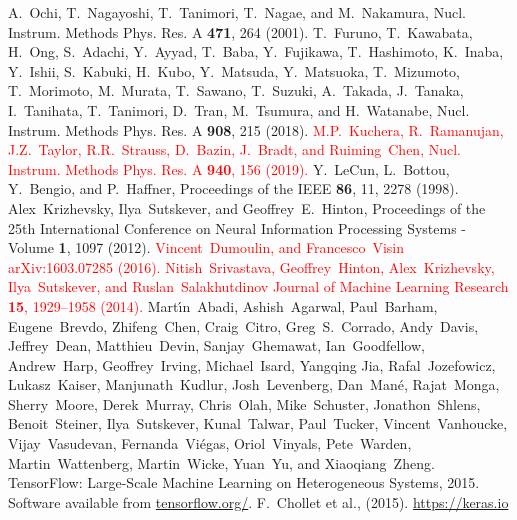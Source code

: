 \documentclass{jps-cp}
\begin{document}
\begin{thebibliography}{9}
  A.~Ochi, T.~Nagayoshi, T.~Tanimori, T.~Nagae, and M.~Nakamura,
  Nucl. Instrum. Methods Phys. Res. A \textbf{471}, 264 (2001).
  T.~Furuno, T.~Kawabata, H.~Ong, S.~Adachi, Y.~Ayyad, T.~Baba, Y.~Fujikawa, T.~Hashimoto, K.~Inaba, Y.~Ishii,
  S.~Kabuki, H.~Kubo, Y.~Matsuda, Y.~Matsuoka, T.~Mizumoto, T.~Morimoto, M.~Murata, T.~Sawano, T.~Suzuki, A.~Takada,
  J.~Tanaka, I.~Tanihata, T.~Tanimori, D.~Tran, M.~Tsumura, and H.~Watanabe,
  Nucl. Instrum. Methods Phys. Res. A \textbf{908}, 215 (2018).
  \textcolor{red}{M.P.~Kuchera, R.~Ramanujan, J.Z.~Taylor, R.R.~Strauss, D.~Bazin, J.~Bradt,
  and Ruiming~Chen, 
  Nucl. Instrum. Methods Phys. Res. A \textbf{940}, 156 (2019).}
  Y.~LeCun, L.~Bottou, Y.~Bengio, and P.~Haffner,
  Proceedings of the IEEE \textbf{86}, 11, 2278 (1998).
  Alex~Krizhevsky, Ilya~Sutskever, and Geoffrey~E.~Hinton,
  Proceedings of the 25th International Conference on Neural Information Processing Systems - Volume \textbf{1}, 1097 (2012).
  \textcolor{red}{
    Vincent~Dumoulin, and Francesco~Visin
    arXiv:1603.07285 (2016).
  }
  \textcolor{red}{
    Nitish~Srivastava, Geoffrey~Hinton, Alex~Krizhevsky, Ilya~Sutskever, and Ruslan~Salakhutdinov
    Journal of Machine Learning Research \textbf{15}, 1929--1958 (2014).}
  Mart\'{\i}n~Abadi,
  Ashish~Agarwal,
  Paul~Barham,
  Eugene~Brevdo,
  Zhifeng~Chen,
  Craig~Citro,
  Greg~S.~Corrado,
  Andy~Davis,
  Jeffrey~Dean,
  Matthieu~Devin,
  Sanjay~Ghemawat,
  Ian~Goodfellow,
  Andrew~Harp,
  Geoffrey~Irving,
  Michael~Isard,
  Yangqing Jia,
  Rafal~Jozefowicz,
  Lukasz~Kaiser,
  Manjunath~Kudlur,
  Josh~Levenberg,
  Dan~Man\'{e},
  Rajat~Monga,
  Sherry~Moore,
  Derek~Murray,
  Chris~Olah,
  Mike~Schuster,
  Jonathon~Shlens,
  Benoit~Steiner,
  Ilya~Sutskever,
  Kunal~Talwar,
  Paul~Tucker,
  Vincent~Vanhoucke,
  Vijay~Vasudevan,
  Fernanda~Vi\'{e}gas,
  Oriol~Vinyals,
  Pete~Warden,
  Martin~Wattenberg,
  Martin~Wicke,
  Yuan~Yu, and
  Xiaoqiang~Zheng.
  {{TensorFlow}: Large-Scale Machine Learning on Heterogeneous Systems},
  2015.
  Software available from \url{tensorflow.org/}.
  F.~Chollet et al., (2015). \url{https://keras.io}
%
  

\end{thebibliography}
\end{document}
